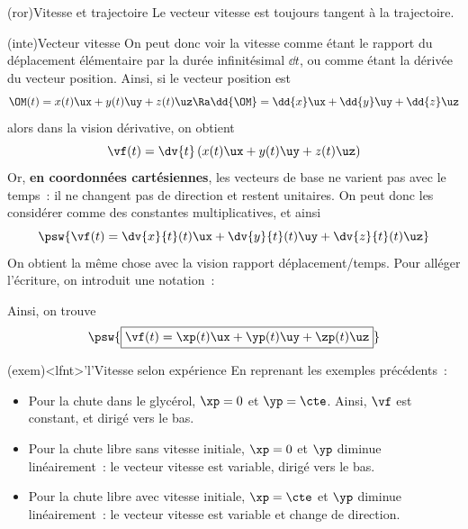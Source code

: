 \documentclass[../../main/main.tex]{subfiles}
\begin{document}
\begin{tcb}[sidebyside, righthand ratio=.25]
\begin{center}
{		}
		\vspace{-15pt}
		\captionsetup{justification=centering}
	\end{center}
\end{tcb}

\begin{tcb}(ror){Vitesse et trajectoire}
	Le vecteur vitesse est toujours tangent à la trajectoire.
\end{tcb}


\begin{tcb*}(inte){Vecteur vitesse}
	On peut donc voir la vitesse comme étant le rapport du déplacement élémentaire
	par la durée infinitésimal $\dd{t}$, ou comme étant la dérivée du vecteur
	position.
	\smallbreak
	Ainsi, si le vecteur position est
	\[
		\OM(t) = x(t)\ux + y(t)\uy + z(t)\uz
		\Ra
		\dd{\OM} = \dd{x}\ux + \dd{y}\uy + \dd{z}\uz
	\]
	alors dans la vision dérivative, on obtient
	\[\vf(t) = \dv{t}\left(x(t)\ux + y(t)\uy + z(t)\uz\right)\]
	Or, \textbf{en coordonnées cartésiennes}, les vecteurs de base ne varient pas
	avec le temps~: il ne changent pas de direction et restent unitaires. On peut
	donc les considérer comme des constantes multiplicatives, et ainsi
	\[\psw{\vf(t) = \dv{x}{t}(t)\ux + \dv{y}{t}(t)\uy + \dv{z}{t}(t)\uz}\]
	On obtient la même chose avec la vision rapport déplacement/temps.
	Pour alléger l'écriture, on introduit une notation~:
\end{tcb*}

Ainsi, on trouve
\[\psw{\boxed{\vf(t) = \xp(t)\ux + \yp(t)\uy + \zp(t)\uz}}\]

\begin{tcb}(exem)<lfnt>'l'{Vitesse selon expérience}
	En reprenant les exemples précédents~:
	\begin{itemize}
		\item Pour la chute dans le glycérol, $\xp = 0$ et $\yp = \cte$. Ainsi,
		      $\vf$ est constant, et dirigé vers le bas.
		\item Pour la chute libre sans vitesse initiale, $\xp = 0$ et $\yp$
		      diminue linéairement~: le vecteur vitesse est variable, dirigé vers
		      le bas.
		\item Pour la chute libre avec vitesse initiale, $\xp = \cte$ et $\yp$
		      diminue linéairement~: le vecteur vitesse est variable et change de
		      direction.
	\end{itemize}
\end{tcb}
\end{document}
